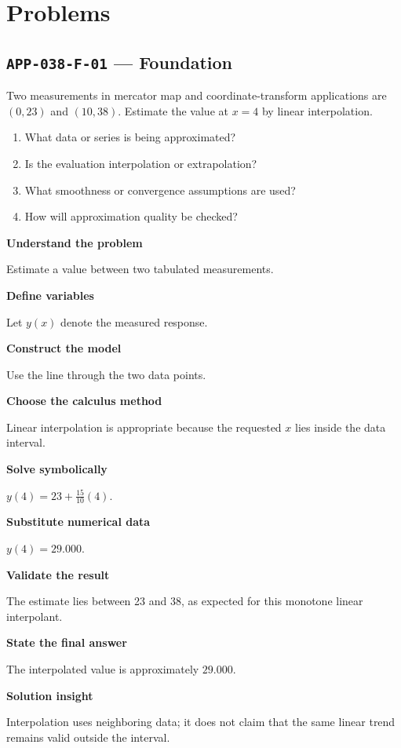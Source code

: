 \documentclass[11pt]{book}
\newcommand{\pid}[1]{\texttt{#1}}
\begin{document}
\section*{Problems}
\subsection*{\pid{APP-038-F-01} — Foundation}
\begin{problembox}
Two measurements in mercator map and coordinate-transform applications are $(0,23)$ and $(10,38)$. Estimate the value at $x=4$ by linear interpolation.
\end{problembox}
\begin{promptbox}\begin{enumerate}
\item What data or series is being approximated?
\item Is the evaluation interpolation or extrapolation?
\item What smoothness or convergence assumptions are used?
\item How will approximation quality be checked?
\end{enumerate}\end{promptbox}
\begin{solutionbox}
\textbf{Understand the problem}\par Estimate a value between two tabulated measurements.\par\medskip
\textbf{Define variables}\par Let $y(x)$ denote the measured response.\par\medskip
\textbf{Construct the model}\par Use the line through the two data points.\par\medskip
\textbf{Choose the calculus method}\par Linear interpolation is appropriate because the requested $x$ lies inside the data interval.\par\medskip
\textbf{Solve symbolically}\par $y(4)=23+\frac{15}{10}(4)$.\par\medskip
\textbf{Substitute numerical data}\par $y(4)=29.000$.\par\medskip
\textbf{Validate the result}\par The estimate lies between 23 and 38, as expected for this monotone linear interpolant.\par\medskip
\textbf{State the final answer}\par The interpolated value is approximately $29.000$.\par\medskip
\textbf{Solution insight}\par Interpolation uses neighboring data; it does not claim that the same linear trend remains valid outside the interval.\par\medskip
\end{solutionbox}
\end{document}
